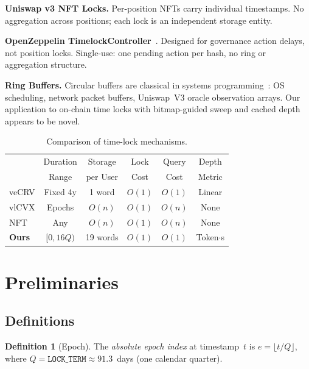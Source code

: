 \documentclass[10pt,a4paper,twocolumn]{article}
\theoremstyle{definition}
\newtheorem{definition}{Definition}[section]
\theoremstyle{plain}
\theoremstyle{remark}
\begin{document}
\textbf{Uniswap v3 NFT Locks.} Per-position NFTs carry individual timestamps. No aggregation across positions; each lock is an independent storage entity.

\textbf{OpenZeppelin TimelockController}~\cite{oz-timelock}. Designed for governance action delays, not position locks. Single-use: one pending action per hash, no ring or aggregation structure.

\textbf{Ring Buffers.} Circular buffers are classical in systems programming~\cite{ring-buffer}: OS scheduling, network packet buffers, Uniswap~V3 oracle observation arrays. Our application to on-chain time locks with bitmap-guided sweep and cached depth appears to be novel.

\begin{table}[htbp]
\centering
\caption{Comparison of time-lock mechanisms.}
\label{tab:comparison}
\small
\begin{tabular*}{0.95\columnwidth}{@{\extracolsep{\fill}}lccccc@{}}
\toprule
& Duration & Storage & Lock & Query & Depth \\
& Range & per User & Cost & Cost & Metric \\
\midrule
veCRV & Fixed 4y & 1 word & $O(1)$ & $O(1)$ & Linear \\
vlCVX & Epochs & $O(n)$ & $O(1)$ & $O(n)$ & None \\
NFT & Any & $O(n)$ & $O(1)$ & $O(n)$ & None \\
\textbf{Ours} & $[0,16Q)$ & 19 words & $O(1)$ & $O(1)$ & Token$\cdot$s \\
\bottomrule
\end{tabular*}
\end{table}

\section{Preliminaries}
\label{sec:preliminaries}

\subsection{Definitions}
\label{subsec:definitions}

\begin{definition}[Epoch]
\label{def:epoch}
The \emph{absolute epoch index} at timestamp~$t$ is $e = \lfloor t / Q \rfloor$, where $Q = \texttt{LOCK\_TERM} \approx 91.3$~days (one calendar quarter).
\end{definition}
\end{document}
